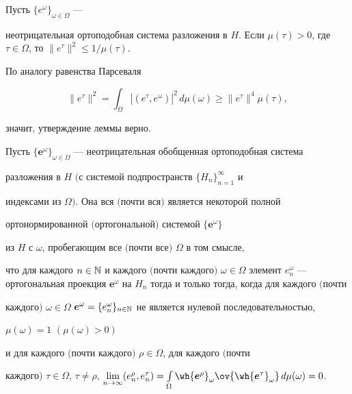 \begin{lem}\hspace{-1.8mm}{\bf.}


Пусть $\{e^\omega\}_{\omega\in\Omega}$ ---


неотрицательная ортоподобная система разложения в $H$. Если $\mu


(\tau)>0$, где $\tau\in\Omega$, то $\|e^\tau\|^2\leqslant


1/{\mu(\tau)}$.


\end{lem}





\begin{pf}


По аналогу равенства Парсеваля


$$


\|e^\tau\|^2=\int_\Omega |(e^\tau,e^\omega)|^2\,d\mu(\omega


)\geqslant\|e^\tau\|^4\mu(\tau),


$$


значит, утверждение леммы верно.


\end{pf}





\begin{thm}\hspace{-1.8mm}{\bf.}


Пусть $\{\boldsymbol e^\omega\}_{\omega


\in\Omega}$ --- неотрицательная обобщенная ортоподобная система


разложения в $H$ $($с системой подпространств $\{H_n\}_{n=1}^\infty$ и


индексами из $\Omega)$. Она вся $($почти вся$)$ является некоторой полной


ортонормированной $($ортогональной$)$ системой $\{\boldsymbol e^\omega\}$


из $H$ с $\omega$, пробегающим все $($почти все$)$ $\Omega$ в том смысле,


что для каждого $n\in{\Bbb N}$ и каждого $($почти каждого$)$ $\omega\in


\Omega$ элемент $e^\omega_n$ --- ортогональная проекция $\boldsymbol


e^\omega$ на $H_n$ тогда и только тогда, когда для каждого $($почти


каждого$)$ $\omega\in\Omega$\; $\boldsymbol e^\omega=\{e^\omega_n


\}_{n\in\Bbb N}$ не является нулевой последовательностью,


$\mu(\omega)=1$ $(\mu(\omega)>0)$


и для каждого $($почти каждого$)$ $\rho\in\Omega$, для каждого $($почти


каждого$)$ $\tau\in\Omega$, $\tau\ne\rho$, $\lim\limits_{n\to\infty}


(e^\rho_n,e^\tau_n)=\int\limits_\Omega\wh{\boldsymbol e^\rho}_\omega


\ov{\wh{\boldsymbol e^\tau}_\omega}\,d\mu(\omega)=0$.


\end{thm}





